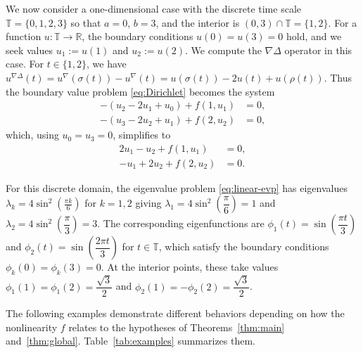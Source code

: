 \documentclass{article}
\numberwithin{equation}{section}
\numberwithin{theorem}{section}
\begin{document}
We now consider a one-dimensional case with the discrete time scale $\mathbb{T} = \{0, 1, 2, 3\}$ so that $a = 0$, $b = 3$, and the interior is $(0,3) \cap \mathbb{T} = \{1, 2\}$. For a function $u\colon \mathbb{T} \to \mathbb{R}$, the boundary conditions $u(0) = u(3) = 0$ hold, and we seek values $u_1 := u(1)$ and $u_2 := u(2)$. We compute the $\nabla\Delta$ operator in this case. For $t \in \{1, 2\}$, we have $u^{\nabla\Delta}(t) = u^{\nabla}(\sigma(t)) - u^{\nabla}(t) = u(\sigma(t)) - 2u(t) + u(\rho(t))$. Thus the boundary value problem \eqref{eq:Dirichlet} becomes the system
\[\begin{aligned}
-(u_2 - 2u_1 + u_0) + f(1, u_1) &= 0,\\
-(u_3 - 2u_2 + u_1) + f(2, u_2) &= 0,
\end{aligned}\]
which, using $u_0 = u_3 = 0$, simplifies to
\begin{equation}\label{eq:ex-system-reduced}
\begin{aligned}
2u_1 - u_2 + f(1, u_1) &= 0,\\
-u_1 + 2u_2 + f(2, u_2) &= 0.
\end{aligned}
\end{equation}

For this discrete domain, the eigenvalue problem \eqref{eq:linear-evp} has eigenvalues
$\lambda_k = 4\sin^2\left(\frac{\pi k}{6}\right)$ for $k = 1,2$ giving $\lambda_1 = 4\sin^2\left(\dfrac{\pi}{6}\right) = 1$ and $\lambda_2 = 4\sin^2\left(\dfrac{\pi}{3}\right) = 3$. The corresponding eigenfunctions are $\phi_1(t) = \sin\left(\dfrac{\pi t}{3}\right)$ and $\phi_2(t) = \sin\left(\dfrac{2\pi t}{3}\right)$ for $t \in \mathbb{T}$, which satisfy the boundary conditions $\phi_k(0) = \phi_k(3) = 0$. At the interior points, these take values $\phi_1(1) = \phi_1(2) = \dfrac{\sqrt{3}}{2}$ and $\phi_2(1) = -\phi_2(2) = \dfrac{\sqrt{3}}{2}$.

The following examples demonstrate different behaviors depending on how the nonlinearity $f$ relates to the hypotheses of Theorems~\ref{thm:main} and~\ref{thm:global}. Table~\ref{tab:examples} summarizes them.
\end{document}
